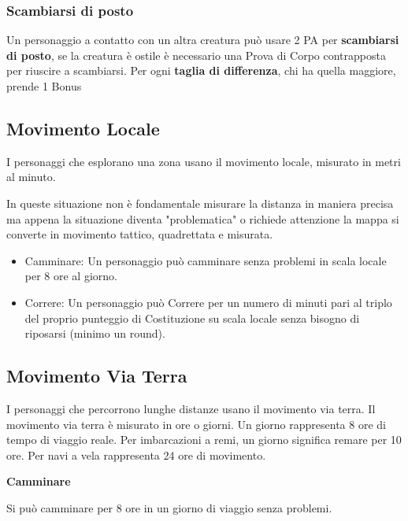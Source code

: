\documentclass[12pt,a4paper,twoside,openany]{book}
\begin{document}
\begin{multicols}{2}
\subsubsection{Scambiarsi di posto}\label{scambiarsidiposto}

Un personaggio a contatto con un altra creatura può usare 2 PA per \textbf{scambiarsi di posto}, se la creatura è ostile è necessario una Prova di Corpo contrapposta per riuscire a scambiarsi. Per ogni \textbf{taglia di differenza}, chi ha quella maggiore, prende 1 Bonus 

\subsection{Movimento Locale}\label{movimentolocale}

I personaggi che esplorano una zona usano il movimento locale, misurato in metri al minuto.

In queste situazione non è fondamentale misurare la distanza in maniera precisa ma appena la situazione diventa "problematica" o richiede attenzione la mappa si converte in movimento tattico, quadrettata e misurata.

\medskip

\begin{itemize}
\item
Camminare: Un personaggio può camminare senza problemi in scala locale per 8 ore al giorno.
\item
Correre: Un personaggio può Correre per un numero di minuti pari al triplo del proprio punteggio di Costituzione su scala locale senza bisogno di riposarsi (minimo un round).
\end{itemize}


\subsection{Movimento Via Terra}\label{movimentoviaterra}

I personaggi che percorrono lunghe distanze usano il movimento via terra. Il movimento via terra è misurato in ore o giorni. Un giorno rappresenta 8 ore di tempo di viaggio reale. Per imbarcazioni a remi, un giorno significa remare per 10 ore. Per navi a vela rappresenta 24 ore di movimento.

\textbf{Camminare}\label{camminare}

Si può camminare per 8 ore in un giorno di viaggio senza problemi.


\end{multicols}
\end{document}
